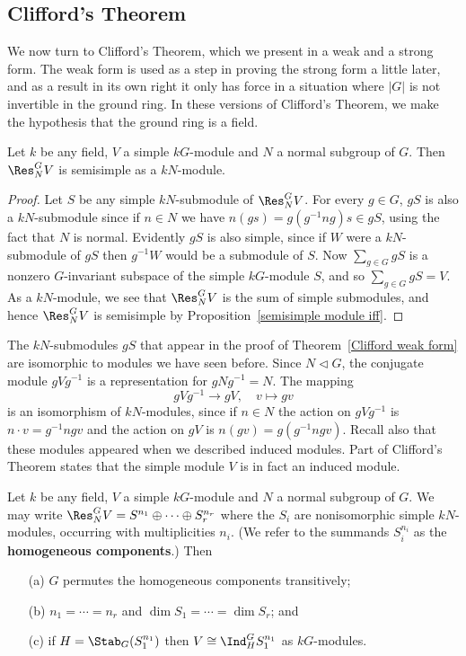 \subsection{Clifford's Theorem}
We now turn to Clifford's Theorem, which we present in a weak and a strong
form. The weak form is used as a step in proving the strong form a little later, and as a result in its own right it only has force in a situation where $|G|$ is not invertible in the ground ring. In these versions of Clifford's Theorem, we make the hypothesis that the ground ring is a field.
\begin{theorem}\label{Clifford weak form}
Let $k$ be any field, $V$ a simple $kG$-module and $N$ a normal subgroup of $G$. Then $\Res^G_NV$ is semisimple as a $kN$-module.
\end{theorem}
\begin{proof}
Let $S$ be any simple $kN$-submodule of $\Res^G_NV$. For every $g\in G$, $gS$ is also a $kN$-submodule since if $n\in N$ we have $n(gs)=g(g^{-1}ng)s\in gS$, using the fact that $N$ is normal. Evidently $gS$ is also simple, since if $W$ were a $kN$-submodule of $gS$ then $g^{-1}W$ would be a submodule of $S$. Now $\sum_{g\in G}gS$ is a nonzero $G$-invariant subspace of the simple $kG$-module $S$, and so $\sum_{g\in G}gS=V$. As a $kN$-module, we see that $\Res^G_NV$ is the sum of simple submodules, and hence $\Res^G_NV$ is semisimple by Proposition~\ref{semisimple module iff}.
\end{proof}
The $kN$-submodules $gS$ that appear in the proof of Theorem~\ref{Clifford weak form} are isomorphic to modules we have seen before. Since $N\lhd G$, the conjugate module $gVg^{-1}$ is a representation for $gNg^{-1}=N$. The mapping
\[gVg^{-1}\to gV,\quad v\mapsto gv\]
is an isomorphism of $kN$-modules, since if $n\in N$ the action on $gVg^{-1}$ is $n\cdot v=g^{-1}ngv$ and the action on $gV$ is $n(gv)=g(g^{-1}ngv)$. Recall also that these modules appeared when we described induced modules. Part of Clifford's Theorem states that the simple module $V$ is in fact an induced module.
\begin{theorem}
Let $k$ be any field, $V$ a simple $kG$-module and $N$ a normal subgroup of $G$. We may write $\Res^G_NV=S^{n_1}\oplus\cdots\oplus S_r^{n_r}$ where the $S_i$ are nonisomorphic simple $kN$-modules, occurring with multiplicities $n_i$. (We refer to the summands $S_i^{n_i}$ as the \textbf{homogeneous components}.) Then
\begin{itemize}
\item[(a)] $G$ permutes the homogeneous components transitively;
\item[(b)] $n_1=\cdots=n_r$ and $\dim S_1=\cdots=\dim S_r$; and
\item[(c)] if $H=\Stab_G(S_1^{n_1})$ then $V\cong\Ind^G_HS_1^{n_1}$ as $kG$-modules.
\end{itemize}
\end{theorem}
